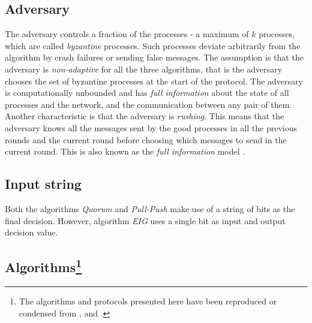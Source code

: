 \subsection{Adversary}
The adversary controls a fraction of the processes - a maximum of $k$ processes, which are called \textit{byzantine} processes. Such processes deviate arbitrarily from the algorithm by crash failures or sending false messages. The assumption is that the adversary is \textit{non-adaptive} for all the three algorithms, that is the adversary chooses the set of byzantine processes at the start of the protocol. The adversary is computationally unbounded and has \textit{full information} about the state of all processes and the network, and the communication between any pair of them. Another characteristic is that the adversary is \textit{rushing}. This means that the adversary knows all the messages sent by the good processes in all the previous rounds and the current round before choosing which messages to send in the current round. This is also known as the \textit{full information} model \cite{GGL98}.

\subsection{Input string}
Both the algorithms \textit{Quorum} and \textit{Pull-Push}  make use of a string of bits as the final decision. However, algorithm \textit{EIG} uses a single bit as input and output decision value.


\subsection{Algorithms\protect\footnote{The algorithms and protocols presented here have been reproduced or condensed from \cite{BPV06}, \cite{KM13} and \cite{BGH13}.}}

